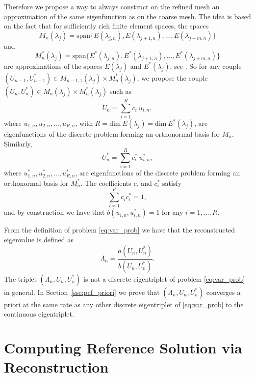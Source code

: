 \documentclass[smallextended]{svjour3}
\begin{document}
Therefore we propose a way to always construct on the refined mesh an approximation of the same eigenfunction as on the coarse mesh. The idea is based on the fact that for sufficiently rich finite element spaces, the spaces
$$
M_n(\lambda_j)=\mathrm{span}\{E(\lambda_{j,n}),E(\lambda_{j+1,n}),\dots, E(\lambda_{j+m,n})\}
$$ 
and 
$$
M_n^*(\lambda_j)=\mathrm{span}\{E^*(\lambda_{j,n}),E^*(\lambda_{j+1,n}),\dots, E^*(\lambda_{j+m,n})\}
$$ 
are approximations of the spaces $E(\lambda_j)$ and $E^*(\lambda_j)$, see \cite{babuska}. 
So for any couple $(U_{n-1},U_{n-1}^*)\in M_{n-1,1}(\lambda_j)\times M_{n}^*(\lambda_j)$, we propose the couple $(U_{n},U_{n}^*)\in M_{n}(\lambda_j)\times M_{n}^*(\lambda_j)$ such as
\begin{equation}\label{eq:const}
U_n=\sum_{i=1}^{R} c_i \ u_{i,n},
\end{equation}
where $u_{1,n},u_{2,n},\dots,u_{R,n}$, with $R=\mathrm{dim}\ E(\lambda_j)=\mathrm{dim}\ E^*(\lambda_j)$, are eigenfunctions of the discrete problem forming  an orthonormal basis for
$M_{n}$.
Similarly,
\begin{equation}\label{eq:const_star}
U_n^*=\sum_{i=1}^{R} c_i^* \ u_{i,n}^*,
\end{equation}
where $u_{1,n}^*,u_{2,n}^*,\dots,u_{R,n}^*$, are eigenfunctions of the discrete problem forming  an orthonormal basis for
$M_{n}^*$.
 The coefficients $c_i$ and $c_i^*$ satisfy 
\begin{equation}\label{eq:cond_on_corf}
\sum_{i=1}^{R} c_ic_i^*=1,
\end{equation}
and by construction we have that $b(u_{i,n},u_{i,n}^*)=1$ for any $i=1,\dots,R$.

From the definition of problem \eqref{eq:var_prob} we have that the reconstructed eigenvalue is defined as
$$
\Lambda_n=\frac{a(U_n,U_n^*)}{b(U_n,U_n^*)}.
$$
The triplet $(\Lambda_n,U_n,U_n^*)$ is not a discrete eigentriplet of problem \eqref{eq:var_prob} in general. 
In Section~\ref{sse:pcf_priori} we prove that $(\Lambda_n,U_n,U_n^*)$ converges a priori at the same 
rate as any other discrete eigentriplet of \eqref{eq:var_prob} to the continuous eigentriplet.

\section{Computing Reference Solution via Reconstruction}\label{sec:recoref}
\end{document}
